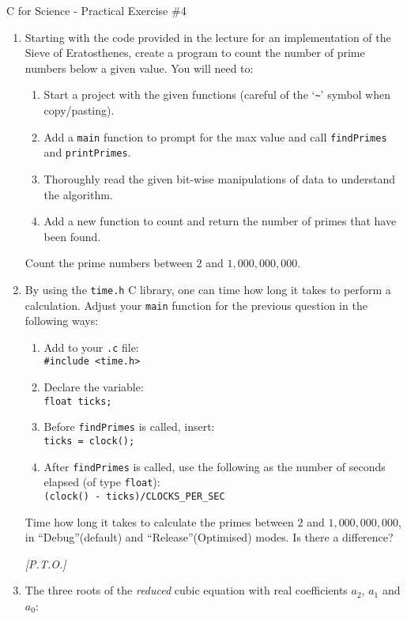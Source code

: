 \documentclass[a4paper,12pt]{article}
\begin{document}
\begin{center}
\large C for Science - Practical Exercise \#4
\end{center}
\begin{enumerate}
\item Starting with the code provided in the lecture for an implementation of the Sieve of Eratosthenes, create a program to count the number of prime numbers below a given value. You will need to:
\begin{enumerate}
\item Start a project with the given functions (careful of the `\verb|~|' symbol when copy/pasting).
\item Add a \texttt{main} function to prompt for the max value and call \texttt{findPrimes} and \texttt{printPrimes}.
\item Thoroughly read the given bit-wise manipulations of data to understand the algorithm.
\item Add a new function to count and return the number of primes that have been found.
\end{enumerate}
Count the prime numbers between $2$ and $1,000,000,000$.
\item By using the \texttt{time.h} C library, one can time how long it takes to perform a calculation. Adjust your \texttt{main} function for the previous question in the following ways:
\begin{enumerate}
\item Add to your \texttt{.c} file:\\
\texttt{\#include <time.h>}
\item Declare the variable:\\
\texttt{float ticks;}
\item Before \texttt{findPrimes} is called, insert:\\
\texttt{ticks = clock();}
\item After \texttt{findPrimes} is called, use the following as the number of seconds elapsed (of type \texttt{float}):\\
\texttt{(clock() - ticks)/CLOCKS\_PER\_SEC}
\end{enumerate}
Time how long it takes to calculate the primes between $2$ and $1,000,000,000$, in ``Debug''(default) and ``Release''(Optimised) modes. Is there a difference?\\
\begin{flushright}\textit{[P.T.O.]}\end{flushright}
\newpage
\item The three roots of the \emph{reduced} cubic equation with real coefficients $a_2$, $a_1$ and $a_0$:

\end{enumerate}
\end{document}
